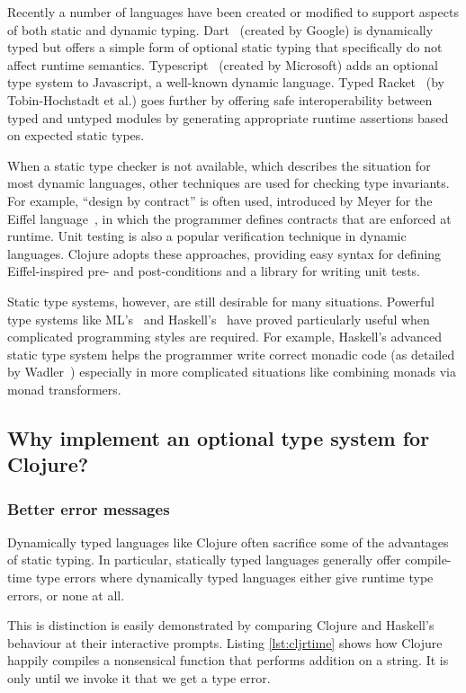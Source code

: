 Recently a number of languages have been created or modified to support aspects
of both static and dynamic typing.
Dart~\cite{Dart2012} (created by Google) is dynamically typed but offers a simple form of optional
static typing that specifically do not affect runtime semantics.
Typescript~\cite{TypeS2012} (created by Microsoft) adds an optional type system to Javascript,
a well-known dynamic language.
Typed Racket~\cite{TF08,Tob10} (by Tobin-Hochstadt et al.) goes further by offering safe interoperability
between typed and untyped modules by generating appropriate runtime assertions based
on expected static types.

When a static type checker is not available, which describes the situation
for most dynamic languages, other techniques are used for checking
type invariants. For example, ``design by contract'' is often used,
introduced by Meyer for the Eiffel language~\cite{Mey92},
in which the programmer defines contracts that are enforced at runtime.
Unit testing is also a popular verification technique in dynamic languages.
Clojure adopts these approaches, providing easy syntax for defining 
Eiffel-inspired pre- and post-conditions and a library for writing unit tests.

Static type systems, however, are still desirable for many situations.
Powerful type systems like ML's~\cite{Mil97} and Haskell's~\cite{Mar10} have proved particularly useful
when complicated programming styles are required. For example,
Haskell's advanced static type system helps the programmer write correct monadic code
(as detailed by Wadler~\cite{Wad95})
especially in more complicated situations like combining monads via monad transformers.

\subsection{Why implement an optional type system for Clojure?}

\subsubsection{Better error messages}

Dynamically typed languages like Clojure often sacrifice some of the advantages of
static typing. In particular, statically typed languages generally offer 
compile-time type errors where dynamically typed languages either give runtime
type errors, or none at all.

This is distinction is easily demonstrated by comparing Clojure and Haskell's behaviour at their interactive prompts.
Listing \ref{lst:cljrtime} shows how Clojure happily compiles a nonsensical function that performs addition
on a string. It is only until we invoke it that we get a type error. 

